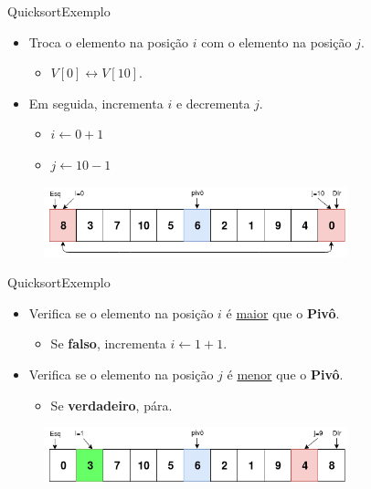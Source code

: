 \documentclass[aspectratio=169]{beamer}
\begin{document}

\begin{frame}{Quicksort}{Exemplo}
\begin{itemize}
 \item Troca o elemento na posição $i$ com o elemento na posição $j$.
 \begin{itemize}
 \item $V[0] \leftrightarrow V[10]$.
 \end{itemize}
 \item Em seguida, incrementa $i$ e decrementa $j$.
 \begin{itemize}
 \item $i \leftarrow 0 + 1$
 \item $j \leftarrow 10 - 1$ 
 \end{itemize} 
\end{itemize}

\begin{figure}[!h]
  \centering
  \includegraphics[width=250pt]{imgs/quick/quick4.png}
  \label{fig_quick4}
\end{figure}
\end{frame}


\begin{frame}{Quicksort}{Exemplo}
\begin{itemize}
 \item Verifica se o elemento na posição $i$ é \underline{maior} que o {\bf Pivô}.
 \begin{itemize}
 \item Se {\bf falso}, incrementa $i \leftarrow 1 + 1$.
 \end{itemize}
 \item Verifica se o elemento na posição $j$ é \underline{menor} que o {\bf Pivô}.
 \begin{itemize}
 \item Se {\bf verdadeiro}, pára.
 \end{itemize}
\end{itemize}

\begin{figure}[!h]
  \centering
  \includegraphics[width=250pt]{imgs/quick/quick5.png}
  \label{fig_quick5}
\end{figure}
\end{frame}
\end{document}
